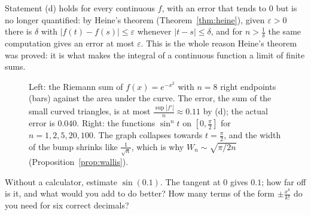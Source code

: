 Statement (d) holds for every continuous $f$, with an error that tends to $0$ but is no longer quantified: by Heine's theorem (Theorem~\ref{thm:heine}), given $\varepsilon>0$ there is $\delta$ with $|f(t)-f(s)|\le\varepsilon$ whenever $|t-s|\le\delta$, and for $n>\frac1\delta$ the same computation gives an error at most $\varepsilon$. This is the whole reason Heine's theorem was proved: it is what makes the integral of a continuous function a limit of finite sums.

\begin{figure}[ht]
\centering
{}
\caption{Left: the Riemann sum of $f(x)=e^{-x^2}$ with $n=8$ right endpoints (bars) against the area under the curve. The error, the sum of the small curved triangles, is at most $\frac{\sup|f'|}n\approx0.11$ by (d); the actual error is $0.040$. Right: the functions $\sin^nt$ on $[0,\frac\pi2]$ for $n=1,2,5,20,100$. The graph collapses towards $t=\frac\pi2$, and the width of the bump shrinks like $\frac1{\sqrt n}$, which is why $W_n\sim\sqrt{\pi/2n}$ (Proposition~\ref{prop:wallis}).}
\label{fig:riemannsum}
\end{figure}

\begin{think}
Without a calculator, estimate $\sin(0.1)$. The tangent at $0$ gives $0.1$; how far off is it, and what would you add to do better? How many terms of the form $\pm\frac{x^k}{k!}$ do you need for six correct decimals?
\end{think}

